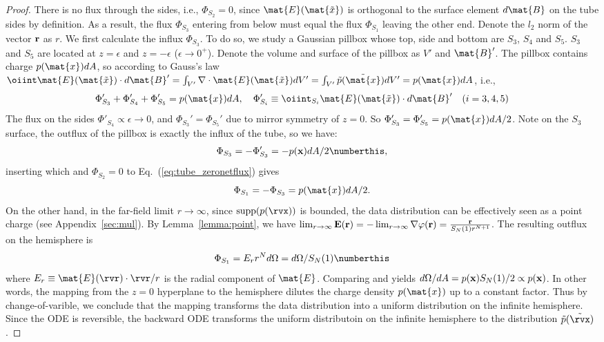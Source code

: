 \begin{proof}
There is no flux through the sides, i.e., $\Phi_{S_2}=0$, since $\mat{E}(\mat{\tilde{x}})$ is orthogonal to the surface element $d\mat{B}$ on the tube sides by definition. As a result, the flux $\Phi_{S_3}$ entering from below must equal the flux $\Phi_{S_1}$ leaving the other end. Denote the $l_2$ norm of the vector ${\bf r}$ as $r$. We first calculate the influx $\Phi_{S_3}$. To do so, we study a Gaussian pillbox whose top, side and bottom are $S_3$, $S_4$ and $S_5$. $S_3$ and $S_5$ are located at $z=\epsilon$ and $z=-\epsilon$ ($\epsilon\to 0^+$). Denote the volume and surface of the pillbox as $V'$ and $\mat{B}'$. The pillbox contains charge $p(\mat{x})dA$, so according to Gauss's law $ \oiint \mat{E}(\mat{\tilde{x}})\cdot d\mat{B}'=\int_{V'} \nabla\cdot \mat{E}(\mat{\tilde{x}}) dV'=\int_{V'}\tilde{p}(\tilde{\mat{x}})dV'=p(\mat{x})dA$, i.e.,
\begin{equation}
    \Phi'_{S_3} + \Phi'_{S_4} + \Phi'_{S_5} = p(\mat{x})dA,\quad \Phi'_{S_i} \equiv \oiint_{S_i} \mat{E}(\mat{\tilde{x}})\cdot d\mat{B}' \quad (i=3,4,5)
\end{equation}
The flux on the sides $\Phi'_{S_4}\propto\epsilon\to 0$, and $\Phi_{S_3}'=\Phi_{S_5}'$ due to mirror symmetry of $z=0$. So $\Phi_{S_3}'=\Phi_{S_5}'=p(\mat{x})dA/2$.  Note on the $S_3$ surface, the outflux of the pillbox is exactly the influx of the tube, so we have:
\begin{align*}
    \Phi_{S_3}=-\Phi_{S_3}' = -p(\x)dA/2\numberthis \label{eq:in},
\end{align*}
inserting which and $\Phi_{S_2}=0$ to Eq.~(\ref{eq:tube_zeronetflux}) gives 
\begin{equation}\label{eq:Phi_S1_1}
    \Phi_{S_1} = -\Phi_{S_3} = p(\mat{x})dA/2.
\end{equation}
On the other hand, in the far-field limit $r\to\infty$, since $\textrm{supp}(p(\rvx))$ is bounded, the data distribution can be effectively seen as a point charge (see Appendix~\ref{sec:mul}). By Lemma~\ref{lemma:point}, we have $\lim_{r\to\infty}{\bf E}({\bf r})=- \lim_{r\to\infty}\nabla\varphi({\bf r}) = \frac{{{\bf r}}}{S_N(1) r^{N+1}}$. The resulting outflux on the hemisphere is
\begin{align*}
    \Phi_{S_1}=E_r r^N d\Omega=d\Omega/S_N(1) \numberthis \label{eq:out}
\end{align*}
where $E_r\equiv\mat{E}(\rvr) \cdot{\rvr}/{r}$ is the radial component of $\mat{E}$. Comparing  and  yields 
$d\Omega/dA=p({\bf x})S_N(1)/2\propto p({\bf x})$.
In other words, the mapping from the $z=0$ hyperplane to the hemisphere dilutes the charge density ${p}({\mat{x}})$ up to a constant factor. Thus by change-of-varible, we conclude that the mapping transforms the data distribution into a uniform distribution on the infinite hemisphere. Since the ODE is reversible, the backward ODE transforms the uniform distributoin on the infinite hemisphere to the distribution $\tilde{p}(\tilde{\rvx})$.
\end{proof}



